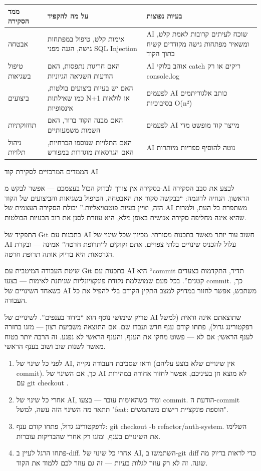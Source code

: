 \begin{center}
\begin{tabularx}{\linewidth}{|X|X|X|}
\hline
\textbf{ממד הסקירה} & \textbf{על מה להקפיד} & \textbf{בעיות נפוצות} \tabularnewline
\hline
אבטחה & אימות קלט, טיפול במפתחות גישה, הגנה מפני SQL Injection & AI שוכח לעיתים קרובות לאמת קלט, ומשאיר מפתחות גישה מקודדים קשיח בתוך הקוד \tabularnewline
טיפול בשגיאות & האם חריגות נתפסות, האם הודעות השגיאה הגיוניות & AI אוהב בלוקי catch ריקים או רק console.log \tabularnewline
ביצועים & האם יש בעיות ביצועים בולטות, כמו שאילתות N+1 או לולאות אינסופיות & לפעמים AI כותב אלגוריתמים בסיבוכיות O(n²) \tabularnewline
תחזוקתיות & האם מבנה הקוד ברור, האם השמות משמעותיים & לפעמים AI מייצר קוד מופשט מדי \tabularnewline
ניהול תלויות & האם התלויות שנוספו הכרחיות, האם הגרסאות מוגדרות במפורש & AI נוטה להוסיף ספריות מיותרות \tabularnewline
\hline
\end{tabularx}
\end{center}

\begin{center}\small\color{gray}הממדים המרכזיים לסקירת קוד AI\end{center}

בסקירה אין צורך לבדוק הכול בעצמכם — אפשר לבקש מ-AI לבצע את סבב הסקירה הראשון. הנחיה לדוגמה: “בבקשה סקור את האבטחה, הטיפול בשגיאות והביצועים של הקוד הזה, וציין בעיות פוטנציאליות.” יכולת הסקירה העצמית של AI משתפרת כל העת, ולמרות שהיא אינה מחליפה סקירה אנושית באופן מלא, היא עוזרת לסנן את רוב הבעיות הבולטות.


התפקיד של Git בתכנות עם AI חשוב עוד יותר מאשר בתכנות מסורתי. מכיוון שכל שינוי של AI עלול להכניס שינויים בלתי צפויים, אתם זקוקים ל“תרופת חרטה” אמינה — ובקרת הגרסאות היא בדיוק אותה תרופת חרטה.

שיטת העבודה המיטבית עם Git בתכנות עם AI היא “commit תדיר, התקדמות בצעדים קטנים”. בכל פעם שמושלמת נקודת פונקציונליות שניתנת לאימות — בצעו commit. כך, כשאחד השינויים של AI משתבש, אפשר לחזור במדויק למצב התקין הקודם בלי להפיל את כל העבודה.

טריק שימושי נוסף הוא “בידוד בענפים”. לשינויים של AI שתוצאתם אינה ודאית (למשל רפקטורינג גדול), פתחו קודם ענף חדש ועבדו שם. אם התוצאה משביעת רצון — מזגו בחזרה לענף הראשי; אם לא — פשוט מחקו את הענף, והענף הראשי לא נפגע. זה הרבה יותר בטוח מאשר לשנות שוב ושוב בענף הראשי.

\begin{enumerate}
  \item לפני כל שינוי של AI, ודאו שסביבת העבודה נקייה (אין שינויים שלא בוצע עליהם commit). כך, אם השינוי של AI לא מוצא חן בעיניכם, אפשר לחזור אחורה במהירות עם git checkout .
  \item אחרי כל שינוי של AI, ומיד כשהאימות עובר — בצעו commit. הודעת ה-commit תתאר מה השינוי הזה עשה, למשל "feat: הוספת פונקציית רישום משתמשים".
  \item לרפקטורינג גדול, פתחו קודם ענף: git checkout -b refactor/auth-system. השלימו את השינויים בענף, ומזגו רק אחרי שהבדיקות עוברות.
  \item פתחו הרגל לעיין ב-diff. אחרי כל שינוי של AI, השתמשו ב-git diff כדי לראות בדיוק מה שונה. זה לא רק עוזר לגלות בעיות — זה גם עוזר לכם ללמוד את הקוד.
\end{enumerate}

